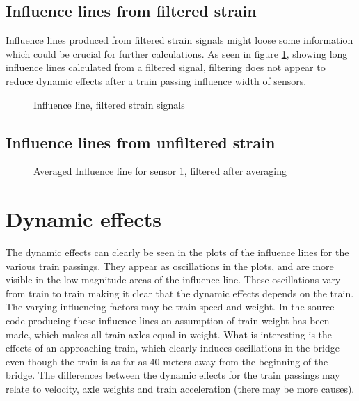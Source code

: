 \subsection{Influence lines from filtered strain}
Influence lines produced from filtered strain signals might loose some information which could be crucial for further calculations. As seen in figure \ref{fig:infl_avg_filtered_before}, showing long influence lines calculated from a filtered signal, filtering does not appear to reduce dynamic effects after a train passing influence width of sensors.
\begin{figure}[H]
	\centering
	\begin{adjustbox}{center}
		
	\end{adjustbox}
	\caption{Influence line, filtered strain signals}
	\label{fig:infl_avg_filtered_before}
\end{figure}

\subsection{Influence lines from unfiltered strain}
\begin{figure}[H]
	\begin{adjustbox}{center}
		
	\end{adjustbox}
	\caption{Averaged Influence line for sensor 1, filtered after averaging}
	\label{fig:infl_avg_filtered_after}
\end{figure}
\section{Dynamic effects}
The dynamic effects can clearly be seen in the plots of the influence lines for the various train passings. They appear as oscillations in the plots, and are more visible in the low magnitude areas of the influence line. These oscillations vary from train to train making it clear that the dynamic effects depends on the train. The varying influencing factors may be train speed and weight. In the source code producing these influence lines an assumption of train weight has been made, which makes all train axles equal in weight.
What is interesting is the effects of an approaching train, which clearly induces oscillations in the bridge even though the train is as far as 40 meters away from the beginning of the bridge. The differences between the dynamic effects for the train passings may relate to velocity, axle weights and train acceleration (there may be more causes).

